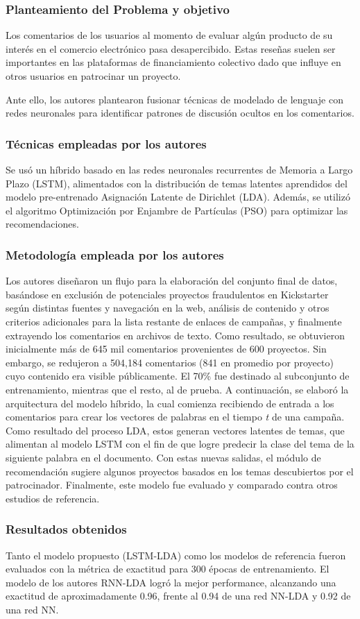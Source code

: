 \subsubsection{Planteamiento del Problema y objetivo}
Los comentarios de los usuarios al momento de evaluar algún producto de su interés en el comercio electrónico pasa desapercibido. Estas reseñas suelen ser importantes en las plataformas de financiamiento colectivo dado que influye en otros usuarios en patrocinar un proyecto.

Ante ello, los autores plantearon fusionar técnicas de modelado de lenguaje con redes neuronales para identificar patrones de discusión ocultos en los comentarios.

\subsubsection{Técnicas empleadas por los autores}
Se usó un híbrido basado en las redes neuronales recurrentes de Memoria a Largo Plazo (LSTM), alimentados con la distribución de temas latentes aprendidos del modelo pre-entrenado Asignación Latente de Dirichlet (LDA). Además, se utilizó el algoritmo Optimización por Enjambre de Partículas (PSO) para optimizar las recomendaciones.

\subsubsection{Metodología empleada por los autores}
Los autores diseñaron un flujo para la elaboración del conjunto final de datos, basándose en exclusión de potenciales proyectos fraudulentos en Kickstarter según distintas fuentes y navegación en la web, análisis de contenido y otros criterios adicionales para la lista restante de enlaces de campañas, y finalmente extrayendo los comentarios en archivos de texto. Como resultado, se obtuvieron inicialmente más de 645 mil comentarios provenientes de 600 proyectos. Sin embargo, se redujeron a 504,184 comentarios (841 en promedio por proyecto) cuyo contenido era visible públicamente. El 70\% fue destinado al subconjunto de entrenamiento, mientras que el resto, al de prueba. A continuación, se elaboró la arquitectura del modelo híbrido, la cual comienza recibiendo de entrada a los comentarios para crear los vectores de palabras en el tiempo \textit{t} de una campaña. Como resultado del proceso LDA, estos generan vectores latentes de temas, que alimentan al modelo LSTM con el fin de que logre predecir la clase del tema de la siguiente palabra en el documento. Con estas nuevas salidas, el módulo de recomendación sugiere algunos proyectos basados en los temas descubiertos por el patrocinador. Finalmente, este modelo fue evaluado y comparado contra otros estudios de referencia.

\subsubsection{Resultados obtenidos}
Tanto el modelo propuesto (LSTM-LDA) como los modelos de referencia fueron evaluados con la métrica de exactitud para 300 épocas de entrenamiento. El modelo de los autores RNN-LDA logró la mejor performance, alcanzando una exactitud de aproximadamente 0.96, frente al 0.94 de una red NN-LDA y 0.92 de una red NN.